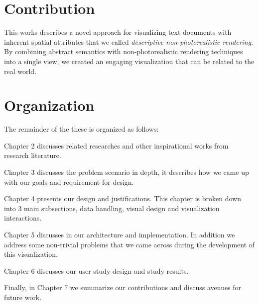 \section{Contribution}
This works describes a novel approach for visualizing text documents with inherent spatial 
attributes that we called \emph{descriptive non-photorealistic rendering}.
By combining abstract semantics with non-photorealistic rendering techniques into a 
single view,  we created an engaging visualization that can be related to the real world.

 

 
\section{Organization}
The remainder of the these is organized as follows:
 
\noindent Chapter 2 discusses related researches and other inspirational works
from research literature.
 
\noindent Chapter 3 discusses the problem scenario in depth, it describes how
we came up with our goals and requirement for design.
 
\noindent Chapter 4 presents our design and justifications. This chapter is
broken down into 3 main subsections, data handling, visual design and
visualization interactions.
 
\noindent Chapter 5 discusses in our architecture and implementation. In
addition we address some non-trivial problems that we came across during the
development of this visualization.
 
\noindent Chapter 6 discusses our user study design and study results. 
 
\noindent Finally, in Chapter 7 we summarize our contributions and discuss
avenues for future work. 
  
 
  
